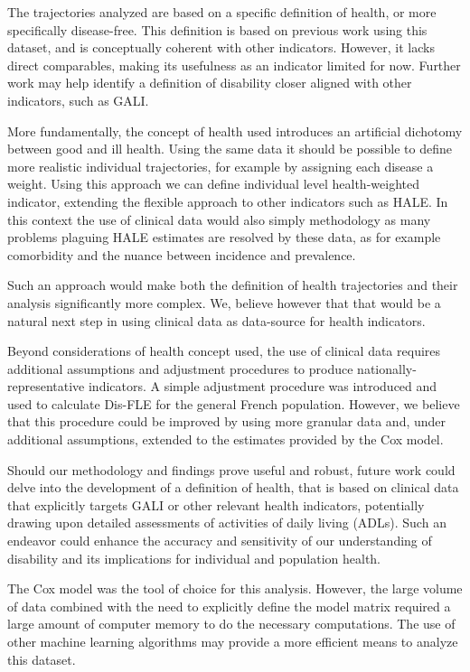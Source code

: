 \documentclass[risks,article,submit,moreauthors,pdftex]{Definitions/mdpi}
\begin{document}
The trajectories analyzed are based on a specific definition of health,
or more specifically disease-free. This definition is based on previous
work using this dataset, and is conceptually coherent with other
indicators. However, it lacks direct comparables, making its usefulness
as an indicator limited for now. Further work may help identify a
definition of disability closer aligned with other indicators, such as
GALI.

More fundamentally, the concept of health used introduces an artificial
dichotomy between good and ill health. Using the same data it should be
possible to define more realistic individual trajectories, for example
by assigning each disease a weight. Using this approach we can define
individual level health-weighted indicator, extending the flexible
approach to other indicators such as HALE. In this context the use of
clinical data would also simply methodology as many problems plaguing
HALE estimates are resolved by these data, as for example comorbidity
and the nuance between incidence and prevalence.

Such an approach would make both the definition of health trajectories
and their analysis significantly more complex. We, believe however that
that would be a natural next step in using clinical data as data-source
for health indicators.

Beyond considerations of health concept used, the use of clinical data
requires additional assumptions and adjustment procedures to produce
nationally-representative indicators. A simple adjustment procedure was
introduced and used to calculate Dis-FLE for the general French
population. However, we believe that this procedure could be improved by
using more granular data and, under additional assumptions, extended to
the estimates provided by the Cox model.

Should our methodology and findings prove useful and robust, future work
could delve into the development of a definition of health, that is
based on clinical data that explicitly targets GALI or other relevant
health indicators, potentially drawing upon detailed assessments of
activities of daily living (ADLs). Such an endeavor could enhance the
accuracy and sensitivity of our understanding of disability and its
implications for individual and population health.

The Cox model was the tool of choice for this analysis. However, the
large volume of data combined with the need to explicitly define the
model matrix required a large amount of computer memory to do the
necessary computations. The use of other machine learning algorithms may
provide a more efficient means to analyze this dataset.
\end{document}
